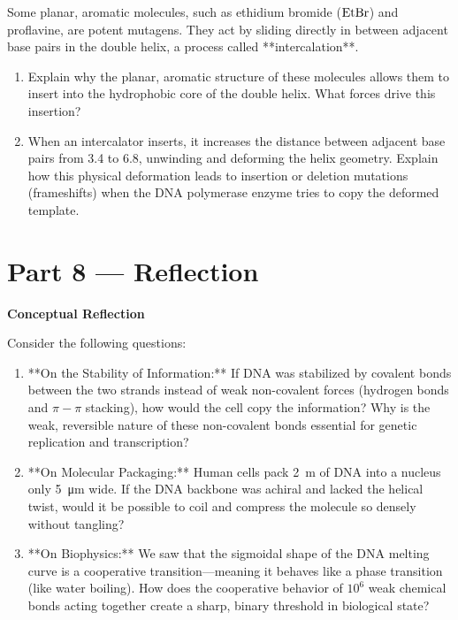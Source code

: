 \documentclass[12pt, a4paper]{book}
\begin{document}
\begin{deepbox}
\begin{enumerate}[label=\textbf{D\arabic*.}]
        Some planar, aromatic molecules, such as ethidium bromide ($\ce{EtBr}$) and proflavine, are potent mutagens.
        They act by sliding directly in between adjacent base pairs in the double helix, a process called **intercalation**.
        \begin{enumerate}[label=(\alph*)]
          \item Explain why the planar, aromatic structure of these molecules allows them to insert into the hydrophobic core of the double helix. What forces drive this insertion?
          \item When an intercalator inserts, it increases the distance between adjacent base pairs from \SI{3.4}{\text{\AA}} to \SI{6.8}{\text{\AA}}, unwinding and deforming the helix geometry.
                Explain how this physical deformation leads to insertion or deletion mutations (frameshifts) when the DNA polymerase enzyme tries to copy the deformed template.
        \end{enumerate}
\end{enumerate}
\end{deepbox}

\newpage

\section{Part 8 --- Reflection}

\begin{reflectionbox}
\textbf{Conceptual Reflection}

Consider the following questions:
\begin{enumerate}
  \item **On the Stability of Information:** If DNA was stabilized by covalent bonds between the two strands instead of weak non-covalent forces (hydrogen bonds and $\pi-\pi$ stacking), how would the cell copy the information? Why is the weak, reversible nature of these non-covalent bonds essential for genetic replication and transcription?
  \item **On Molecular Packaging:** Human cells pack \SI{2}{m} of DNA into a nucleus only \SI{5}{\micro m} wide. If the DNA backbone was achiral and lacked the helical twist, would it be possible to coil and compress the molecule so densely without tangling?
  \item **On Biophysics:** We saw that the sigmoidal shape of the DNA melting curve is a cooperative transition—meaning it behaves like a phase transition (like water boiling). How does the cooperative behavior of $10^6$ weak chemical bonds acting together create a sharp, binary threshold in biological state?
\end{enumerate}
\end{reflectionbox}
\end{document}
